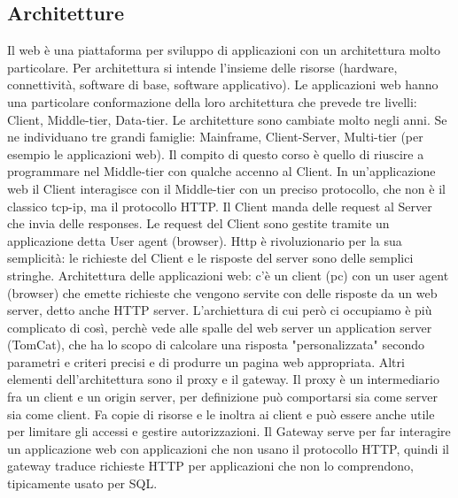 \subsection{Architetture}
Il web è una piattaforma per sviluppo di applicazioni con un architettura molto particolare. Per architettura si intende l'insieme delle risorse (hardware, connettività, software di base, software applicativo).\newline
Le applicazioni web hanno una particolare conformazione della loro architettura che prevede tre livelli: Client, Middle-tier, Data-tier.\newline 
Le architetture sono  cambiate molto negli anni. Se ne individuano tre grandi famiglie: Mainframe, Client-Server, Multi-tier (per esempio le applicazioni web). \newline
Il compito di questo corso è quello di riuscire a programmare nel Middle-tier con qualche accenno al Client.
In un'applicazione web il Client interagisce con il Middle-tier con un preciso protocollo, che non è il classico tcp-ip, ma il protocollo HTTP.\newline
Il Client manda delle request al Server che invia delle responses. Le request del Client sono gestite tramite un applicazione detta User agent (browser).\newline
Http è rivoluzionario per la sua semplicità: le richieste del Client e le risposte del server sono delle semplici stringhe. \newline
Architettura delle applicazioni web: c'è un client (pc) con un user agent (browser) che emette richieste che vengono servite con delle risposte da un web server, detto anche HTTP server. L'archiettura di cui però ci occupiamo è più complicato di così, perchè vede alle spalle del web server un application server (TomCat), che ha lo scopo di calcolare una risposta "personalizzata" secondo parametri e criteri precisi e di produrre un pagina web appropriata.\newline
Altri elementi dell'architettura sono il proxy e il gateway. Il proxy è un intermediario fra un client e un origin server, per definizione può comportarsi sia come server sia come client. Fa copie di risorse e le inoltra ai client e può essere anche utile per limitare gli accessi e gestire autorizzazioni. Il Gateway serve per far interagire un applicazione web con applicazioni che non usano il protocollo HTTP, quindi il gateway traduce richieste HTTP per applicazioni che non lo comprendono, tipicamente usato per SQL.
